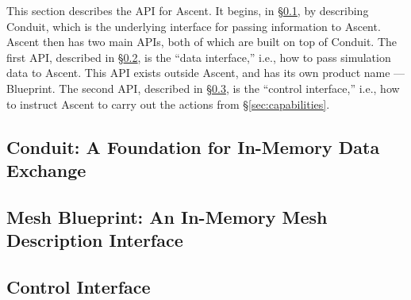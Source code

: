 This section describes the API for Ascent.
%
It begins, in \S\ref{Conduit}, by describing Conduit, which is the underlying
interface for passing information to Ascent.
%
Ascent then has two main APIs, both of which are built on top of Conduit.
%
%
The first API, described in \S\ref{Blueprint}, is the ``data interface,'' i.e., how
to pass simulation data to Ascent.
%
This API exists outside Ascent, and has its own product name --- Blueprint.
%
The second API, described in \S\ref{ascent_control}, is the ``control interface,''
i.e., how to instruct Ascent to carry out the actions from \S\ref{sec:capabilities}.

\subsection{Conduit: A Foundation for In-Memory Data Exchange}
\label{Conduit}


\subsection{Mesh Blueprint: An In-Memory Mesh Description Interface}
\label{Blueprint}


\subsection{Control Interface}
\label{ascent_control}


